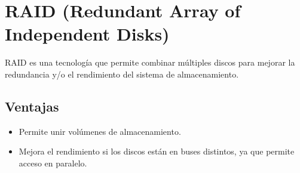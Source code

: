 \section{RAID (Redundant Array of Independent Disks)}

RAID es una tecnología que permite combinar múltiples discos para mejorar la redundancia y/o el rendimiento del sistema de almacenamiento.

\subsection{Ventajas}
\begin{itemize}
    \item Permite unir volúmenes de almacenamiento.
    \item Mejora el rendimiento si los discos están en buses distintos, ya que permite acceso en paralelo.
\end{itemize}

